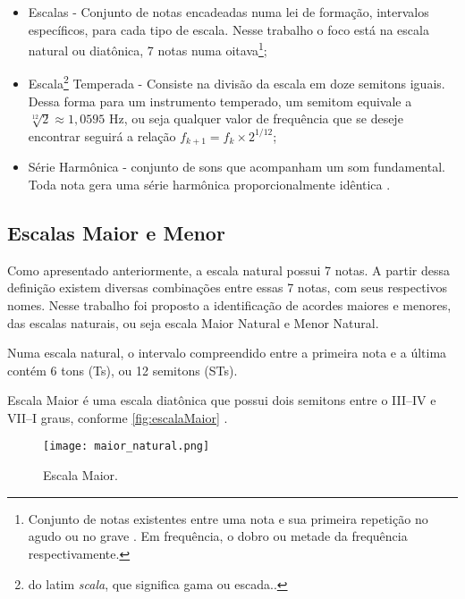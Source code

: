 \begin{itemize}
   \item Escalas - Conjunto de notas encadeadas numa lei de formação, intervalos específicos, para cada tipo de escala. Nesse trabalho o foco está na escala natural ou diatônica, 7 notas numa oitava\footnote{Conjunto de notas existentes entre uma nota e sua primeira repetição no agudo ou no grave \cite{lacerda1967}. Em frequência, o dobro ou metade da frequência respectivamente.};
   \item Escala\footnote{do latim \textit{scala}, que significa gama ou escada.\cite{med1996}.} Temperada - Consiste na divisão da escala em doze semitons iguais. Dessa forma para um instrumento temperado, um semitom equivale a $\sqrt[12]{2}\approx1,0595$ Hz, ou seja qualquer valor de frequência que se deseje encontrar seguirá a relação $f_{k+1} = f_k\times2^{1/12}$;
   \item Série Harmônica - conjunto de sons que acompanham um som fundamental. Toda nota gera uma série harmônica proporcionalmente idêntica \cite[p. 92]{med1996}.
\end{itemize}

\subsection{Escalas Maior e Menor}

Como apresentado anteriormente, a escala natural possui 7 notas. A partir dessa definição existem diversas combinações entre essas 7 notas, com seus respectivos nomes. Nesse trabalho foi proposto a identificação de acordes maiores e menores, das escalas naturais, ou seja escala Maior Natural e Menor Natural.

Numa escala natural, o intervalo compreendido entre a primeira nota e a última contém 6 tons (Ts), ou 12 semitons (STs). 

Escala Maior é uma escala diatônica que possui dois semitons entre o III--IV e VII--I graus, conforme \autoref{fig:escalaMaior} \cite{med1996}.

\begin{figure}[H]
   \begin{center}   
      \caption{Escala Maior.}
      \label{fig:escalaMaior}
      \texttt{[image: maior\_natural.png]}
    \end{center}
\end{figure}